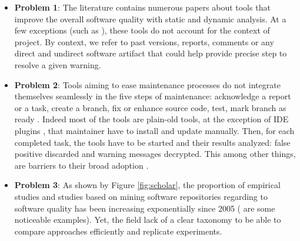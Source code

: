 \begin{itemize}

		\item {\bf Problem 1}: The literature contains numerous papers about tools that improve the overall software quality with static \cite{Dangel2000, burn2003checkstyle, Hovemeyer2007, Moha2010} and dynamic \cite{Nayrolles,Nayrolles2013a,Palma2013} analysis.
		At a few exceptions (such as \cite{Lopez2011, Montandon2013}), these tools do not account for the context of project.
		By context, we refer to past versions, reports, comments or any direct and undirect software artifact that could help provide precise step to resolve a given warning.

		\item {\bf Problem 2}: Tools aiming to ease maintenance processes do not integrate themselves seamlessly in the  five steps of maintenance: acknowledge a report or a task, create a branch, fix or enhance source code, test, mark branch as ready	\cite{Kamiya2002a, Nayrolles,Nayrolles2013a,Jeffrey2009,Chen2013,Gavrilov2013,Jin2012,Nessa2008,Dallmeier,Nayrolles2015a,demange2013,Jiang2007,Iss2009}.
		Indeed most of the tools are plain-old tools, at the exception of IDE plugins \cite{Kamiya2002a, Hovemeyer2007}, that maintainer have to install and update manually.
		Then, for each completed task, the tools have to be started and their results analyzed: false positive discarded and warning messages decrypted.
		This among other things, are barriers to their broad adoption \cite{Johnson2013,Lewis2013}.

		\item {\bf Problem 3}: As shown by Figure \ref{fig:scholar}, the proportion of empirical studies and studies based on mining software repositories regarding to software quality has been increasing exponentially since 2005 (\cite{Kim2011a,Lee2011a,Sun2011,Bhattacharya2011,Tian2012a,Zimmermann2012, Shang2013, Chen2014, McIntosh, Hemmati2015} are some noticeable examples).
		Yet, the field lack of a clear taxonomy to be able to compare approaches efficiently and replicate experiments\cite{Hassan2008,Godfrey2009}.


\end{itemize}

